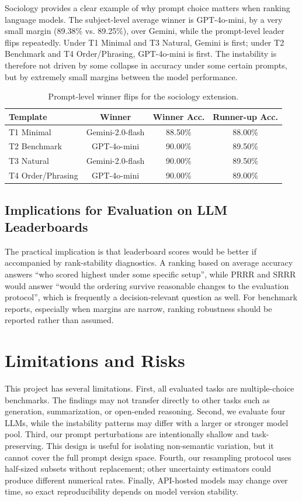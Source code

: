 \documentclass[11pt]{article}
\theoremstyle{definition}
\begin{document}
Sociology provides a clear example of why prompt choice matters when ranking language models. The subject-level average winner is GPT-4o-mini, by a very small margin (89.38\% vs. 89.25\%), over Gemini, while the prompt-level leader flips repeatedly. Under T1 Minimal and T3 Natural, Gemini is first; under T2 Benchmark and T4 Order/Phrasing, GPT-4o-mini is first. The instability is therefore not driven by some collapse in accuracy under some certain prompts, but by extremely small margins between the model performance.

\begin{table}[H]
\centering
\caption{Prompt-level winner flips for the sociology extension.}
\label{tab:sociology_case}
\begin{tabular}{@{}lccc@{}}
\toprule
\textbf{Template} & \textbf{Winner} & \textbf{Winner Acc.} & \textbf{Runner-up Acc.} \\
\midrule
T1 Minimal & Gemini-2.0-flash & 88.50\% & 88.00\% \\
T2 Benchmark & GPT-4o-mini & 90.00\% & 89.50\% \\
T3 Natural & Gemini-2.0-flash & 90.00\% & 89.50\% \\
T4 Order/Phrasing & GPT-4o-mini & 90.00\% & 89.00\% \\
\bottomrule
\end{tabular}
\end{table}

\subsection{Implications for Evaluation on LLM Leaderboards}

The practical implication is that leaderboard scores would be better if accompanied by rank-stability diagnostics. A ranking based on average accuracy answers ``who scored highest under some specific setup'', while PRRR and SRRR would answer ``would the ordering survive reasonable changes to the evaluation protocol'', which is frequently a decision-relevant question as well. For benchmark reports, especially when margins are narrow, ranking robustness should be reported rather than assumed.

\section{Limitations and Risks}

This project has several limitations. First, all evaluated tasks are multiple-choice benchmarks. The findings may not transfer directly to other tasks such as generation, summarization, or open-ended reasoning. Second, we evaluate four LLMs, while the instability patterns may differ with a larger or stronger model pool. Third, our prompt perturbations are intentionally shallow and task-preserving. This design is useful for isolating non-semantic variation, but it cannot cover the full prompt design space. Fourth, our resampling protocol uses half-sized subsets without replacement; other uncertainty estimators could produce different numerical rates. Finally, API-hosted models may change over time, so exact reproducibility depends on model version stability.
\end{document}
